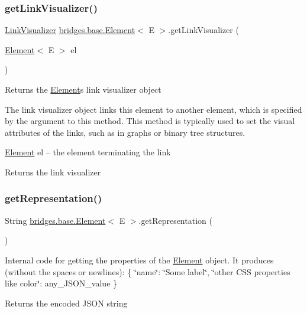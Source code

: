 \subsubsection{\texorpdfstring{get\+Link\+Visualizer()}{getLinkVisualizer()}}
{\footnotesize\ttfamily \hyperlink{classbridges_1_1base_1_1_link_visualizer}{Link\+Visualizer} \hyperlink{classbridges_1_1base_1_1_element}{bridges.\+base.\+Element}$<$ E $>$.get\+Link\+Visualizer (\begin{DoxyParamCaption}\item[{\hyperlink{classbridges_1_1base_1_1_element}{Element}$<$ E $>$}]{el }\end{DoxyParamCaption})}

Returns the \hyperlink{classbridges_1_1base_1_1_element}{Element}\textquotesingle{}s link visualizer object

The link visualizer object links this element to another element, which is specified by the argument to this method. This method is typically used to set the visual attributes of the links, such as in graphs or binary tree structures.

\hyperlink{classbridges_1_1base_1_1_element}{Element} el -- the element terminating the link

\begin{DoxyReturn}{Returns}
the link visualizer 
\end{DoxyReturn}
\hypertarget{classbridges_1_1base_1_1_element_a16c4c7e0d511fbf0e205d5606b9d690e}{}\label{classbridges_1_1base_1_1_element_a16c4c7e0d511fbf0e205d5606b9d690e} 
\subsubsection{\texorpdfstring{get\+Representation()}{getRepresentation()}}
{\footnotesize\ttfamily String \hyperlink{classbridges_1_1base_1_1_element}{bridges.\+base.\+Element}$<$ E $>$.get\+Representation (\begin{DoxyParamCaption}{ }\end{DoxyParamCaption})}

Internal code for getting the properties of the \hyperlink{classbridges_1_1base_1_1_element}{Element} object. It produces (without the spaces or newlines)\+: \{ \char`\"{}name\char`\"{}\+: \char`\"{}\+Some label\char`\"{}, \char`\"{}other C\+S\+S properties like color\char`\"{}\+: any\+\_\+\+J\+S\+O\+N\+\_\+value \} \begin{DoxyReturn}{Returns}
the encoded J\+S\+ON string 
\end{DoxyReturn}
\hypertarget{classbridges_1_1base_1_1_element_a44ddc61db34b6cf0bab7dfba667d54af}{}\label{classbridges_1_1base_1_1_element_a44ddc61db34b6cf0bab7dfba667d54af} 
